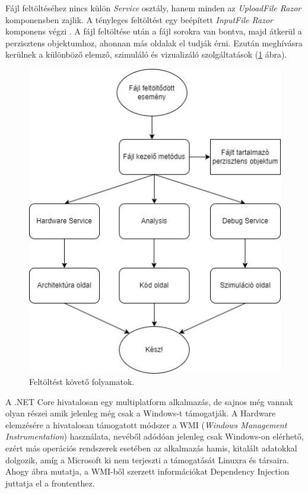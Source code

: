 Fájl feltöltéséhez nincs külön \textit{Service} osztály, hanem minden az \textit{UploadFile	 Razor} komponensben zajlik. A tényleges feltöltést egy beépített \textit{InputFile Razor} komponens végzi \cite{upload}. A fájl feltöltése után a fájl sorokra van bontva, majd átkerül a perzisztens objektumhoz, ahonnan más oldalak el tudják érni. Ezután meghívásra kerülnek a különböző elemző, szimuláló és vizualizáló szolgáltatások (\ref{fig:up} ábra).

\begin{figure}[h]
\centering
\includegraphics[scale=0.5]{images/UploadFlow.jpg}
\caption{Feltöltést követő folyamatok.}
\label{fig:up}
\end{figure}

A .NET Core hivatalosan egy multiplatform alkalmazás, de sajnos még vannak olyan részei amik jelenleg még csak a Windows-t támogatják. A Hardware elemzésére a hivatalosan támogatott módszer a WMI (\textit{Windows Management Instrumentation}) használata, nevéből adódóan jelenleg csak Windows-on elérhető, ezért más operációs rendszerek esetében az alkalmazás hamis, kitalált adatokkal dolgozik, amíg a Microsoft ki nem terjeszti a támogatását Linuxra és társaira. Ahogy  ábra mutatja, a WMI-ből szerzett információkat Dependency Injection juttatja el a frontenthez.

